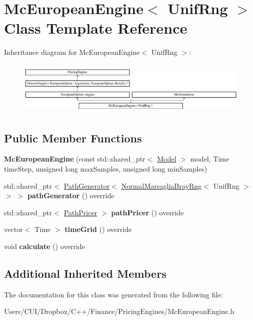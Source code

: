 \hypertarget{class_mc_european_engine}{}\section{Mc\+European\+Engine$<$ Unif\+Rng $>$ Class Template Reference}
\label{class_mc_european_engine}
Inheritance diagram for Mc\+European\+Engine$<$ Unif\+Rng $>$\+:\begin{figure}[H]
\begin{center}
\leavevmode
\includegraphics[height=2.586605cm]{class_mc_european_engine}
\end{center}
\end{figure}
\subsection*{Public Member Functions}
\begin{DoxyCompactItemize}
\item 
\hypertarget{class_mc_european_engine_ae43a5aacc327f15f33e63e3c505ec324}{}\label{class_mc_european_engine_ae43a5aacc327f15f33e63e3c505ec324} 
{\bfseries Mc\+European\+Engine} (const std\+::shared\+\_\+ptr$<$ \hyperlink{class_model}{Model} $>$ model, Time time\+Step, unsigned long max\+Samples, unsigned long min\+Samples)
\item 
\hypertarget{class_mc_european_engine_ae2a93d63269eac42449f8b958ec15535}{}\label{class_mc_european_engine_ae2a93d63269eac42449f8b958ec15535} 
std\+::shared\+\_\+ptr$<$ \hyperlink{class_path_generator}{Path\+Generator}$<$ \hyperlink{class_normal_marsaglia_bray_rng}{Normal\+Marsaglia\+Bray\+Rng}$<$ Unif\+Rng $>$ $>$ $>$ {\bfseries path\+Generator} () override
\item 
\hypertarget{class_mc_european_engine_a21dd3ee9970dd5bae2be03a723d0a290}{}\label{class_mc_european_engine_a21dd3ee9970dd5bae2be03a723d0a290} 
std\+::shared\+\_\+ptr$<$ \hyperlink{class_path_pricer}{Path\+Pricer} $>$ {\bfseries path\+Pricer} () override
\item 
\hypertarget{class_mc_european_engine_a76252919552e4061795e30f30947a1ee}{}\label{class_mc_european_engine_a76252919552e4061795e30f30947a1ee} 
vector$<$ Time $>$ {\bfseries time\+Grid} () override
\item 
\hypertarget{class_mc_european_engine_a51b2f0147fbaf2b84c65851bbc2baa7b}{}\label{class_mc_european_engine_a51b2f0147fbaf2b84c65851bbc2baa7b} 
void {\bfseries calculate} () override
\end{DoxyCompactItemize}
\subsection*{Additional Inherited Members}


The documentation for this class was generated from the following file\+:\begin{DoxyCompactItemize}
\item 
Users/\+C\+U\+I/\+Dropbox/\+C++/\+Finance/\+Pricing\+Engines/Mc\+European\+Engine.\+h\end{DoxyCompactItemize}
